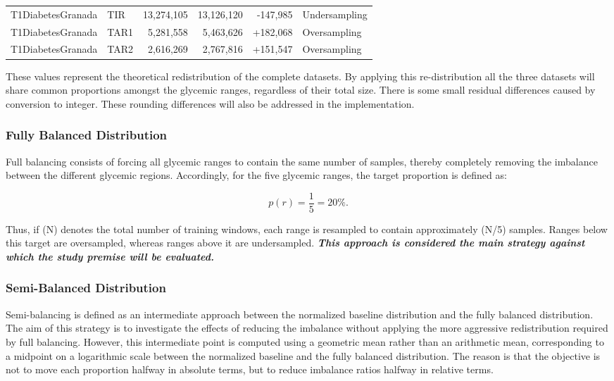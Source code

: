 \begin{table}[htbp]
{\begin{tabular}{llrrrl}
        T1DiabetesGranada
        & TIR
        & 13,274,105 & 13,126,120 & -147,985 & Undersampling \\

        T1DiabetesGranada
        & TAR1
        & 5,281,558 & 5,463,626 & +182,068 & Oversampling \\

        T1DiabetesGranada
        & TAR2
        & 2,616,269 & 2,767,816 & +151,547 & Oversampling \\
        \hline
    \end{tabular}%
    }
\end{table}

These values represent the theoretical redistribution of the complete datasets. By applying this re-distribution all the three datasets will share common proportions amongst the glycemic ranges, regardless of their total size. There is some small residual differences caused by conversion to integer. These rounding differences will also be addressed in the implementation. 

\subsubsection{Fully Balanced Distribution}
\label{subsubsec:full_balancing_distribution}

Full balancing consists of forcing all glycemic ranges to contain the same number of samples, thereby completely removing the imbalance between the different glycemic regions. Accordingly, for the five glycemic ranges, the target proportion is defined as:

\[
p(r)=\frac{1}{5}=20\%.
\]

Thus, if (N) denotes the total number of training windows, each range is resampled to contain approximately (N/5) samples. Ranges below this target are oversampled, whereas ranges above it are undersampled. \textbf{\textit{This approach is considered the main strategy against which the study premise will be evaluated.}}

\subsubsection{Semi-Balanced Distribution}
\label{subsubsec:semi_balancing_distribution}

Semi-balancing is defined as an intermediate approach between the normalized baseline distribution and the fully balanced distribution. The aim of this strategy is to investigate the effects of reducing the imbalance without applying the more aggressive redistribution required by full balancing. However, this intermediate point is computed using a geometric mean rather than an arithmetic mean, corresponding to a midpoint on a logarithmic scale between the normalized baseline and the fully balanced distribution. The reason is that the objective is not to move each proportion halfway in absolute terms, but to reduce imbalance ratios halfway in relative terms.

